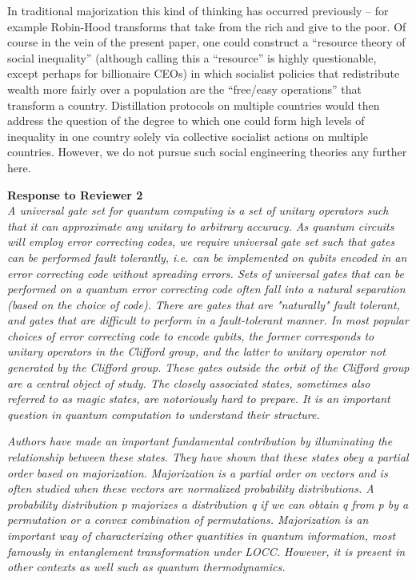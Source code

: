 \documentclass[11pt]{letter}
\begin{document}
In traditional majorization this kind of thinking has occurred previously -- for example Robin-Hood transforms that take from the rich and give to the poor. Of course in the vein of the present paper,  one could construct a ``resource theory of social inequality'' (although calling this a ``resource'' is highly questionable,  except perhaps for billionaire CEOs) in which socialist policies that redistribute wealth more fairly over a population are the ``free/easy operations'' that transform a country.  Distillation protocols on multiple countries would then address the question of the degree to which one could form high levels of inequality in one country solely via collective socialist actions on multiple countries.  However, we do not pursue such social engineering theories any further here.

\textbf{\large{Response to Reviewer 2}}\\

\textit{A universal gate set for quantum computing is a set of unitary operators such that it can approximate any unitary to arbitrary accuracy. As quantum circuits will employ error correcting codes, we require universal gate set such that gates can be performed fault tolerantly, i.e. can be implemented on qubits encoded in an error correcting code without spreading errors. Sets of universal gates that can be performed on a quantum error correcting code often fall into a natural separation (based on the choice of code). There are gates that are "naturally" fault tolerant, and gates that are difficult to perform in a fault-tolerant manner. In most popular choices of error correcting code to encode qubits, the former corresponds to unitary operators in the Clifford group, and the latter to unitary operator not generated by the Clifford group. These gates outside the orbit of the Clifford group are a central object of study. The closely associated states, sometimes also referred to as magic
states, are notoriously hard to prepare. It is an important question in quantum computation to understand their structure.}

\textit{Authors have made an important fundamental contribution by illuminating the relationship between these states. They have shown that these states obey a partial order based on majorization. Majorization is a partial order on vectors and is often studied when these vectors are normalized probability distributions. A probability distribution p majorizes a distribution q if we can obtain q from p by a permutation or a convex combination of permutations. Majorization is an important way of characterizing other quantities in quantum information, most famously in entanglement transformation under LOCC. However, it is present in other contexts as well such as quantum thermodynamics.}
\end{document}
